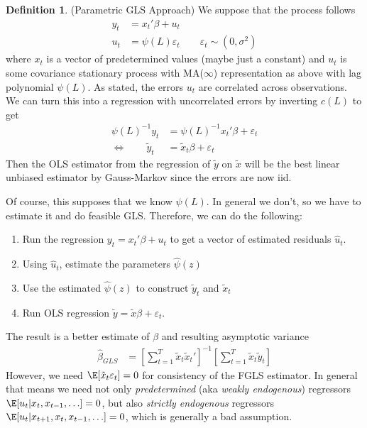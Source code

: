 \documentclass[12pt]{article}
\theoremstyle{plain}
\theoremstyle{definition}
\newtheorem{defn}[thm]{Definition}
\theoremstyle{remark}
\newcommand{\sumtT}{\sum^T_{t=1}}
\begin{document}
\begin{defn}(Parametric GLS Approach)
We suppose that the process follows
\begin{align*}
  y_t &= x_t'\beta + u_t \\
  u_t &= \psi(L)\varepsilon_t
  \qquad \varepsilon_t\sim (0,\sigma^2)
\end{align*}
where $x_t$ is a vector of predetermined values (maybe just a constant)
and $u_t$ is some covariance stationary process with MA($\infty$)
representation as above with lag polynomial $\psi(L)$.  As stated, the
errors $u_t$ are correlated across observations. We can turn this into a
regression with uncorrelated errors by inverting $c(L)$ to get
\begin{align*}
  \psi(L)^{-1}y_t &= \psi(L)^{-1}x_t'\beta + \varepsilon_t \\
  \iff\qquad
  \tilde{y}_t &= \tilde{x}_t\beta + \varepsilon_t
\end{align*}
Then the OLS estimator from the regression of $\tilde{y}$ on $\tilde{x}$
will be the best linear unbiased estimator by Gauss-Markov since the
errors are now iid.

Of course, this supposes that we know $\psi(L)$. In general we don't, so
we have to estimate it and do feasible GLS. Therefore, we can do the
following:
\begin{enumerate}[label=(\roman*)]
  \item Run the regression $y_t=x_t'\beta +u_t$ to get a vector of
    estimated residuals $\hat{u}_t$.
  \item Using $\hat{u}_t$, estimate the parameters $\hat{\psi}(z)$
  \item Use the estimated $\hat{\psi}(z)$ to construct $\tilde{y}_t$ and
    $\tilde{x}_t$
  \item Run OLS regression $\tilde{y}=\tilde{x}\beta + \varepsilon_t$.
\end{enumerate}
The result is a better estimate of $\beta$ and resulting asymptotic
variance
\begin{align*}
  \hat{\beta}_{GLS}
  &=
  \left[ \sumtT \tilde{x}_t\tilde{x}_t'\right]^{-1}
  \left[ \sumtT \tilde{x}_t\tilde{y}_t\right]
\end{align*}
However, we need $\E[\tilde{x}_t\varepsilon_t]=0$ for consistency of the
FGLS estimator. In general that means we need not only
\emph{predetermined} (aka \emph{weakly endogenous}) regressors
$\E[u_t|x_t,x_{t-1},\ldots]=0$, but also \emph{strictly endogenous}
regressors $\E[u_t|x_{t+1},x_t,x_{t-1},\ldots]=0$, which is generally a
bad assumption.


\end{defn}
\end{document}
